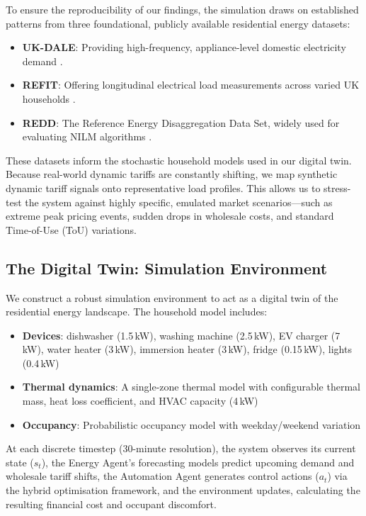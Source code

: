 \documentclass[11pt,a4paper]{article}
\begin{document}
To ensure the reproducibility of our findings, the simulation draws on established patterns from three foundational, publicly available residential energy datasets:
\begin{itemize}
    \item \textbf{UK-DALE}: Providing high-frequency, appliance-level domestic electricity demand \cite{kelly2015ukdale}.
    \item \textbf{REFIT}: Offering longitudinal electrical load measurements across varied UK households \cite{murray2017electrical}.
    \item \textbf{REDD}: The Reference Energy Disaggregation Data Set, widely used for evaluating NILM algorithms \cite{kolter2011redd}.
\end{itemize}

These datasets inform the stochastic household models used in our digital twin. Because real-world dynamic tariffs are constantly shifting, we map synthetic dynamic tariff signals onto representative load profiles. This allows us to stress-test the system against highly specific, emulated market scenarios---such as extreme peak pricing events, sudden drops in wholesale costs, and standard Time-of-Use (ToU) variations.

\subsection{The Digital Twin: Simulation Environment}

We construct a robust simulation environment to act as a digital twin of the residential energy landscape. The household model includes:
\begin{itemize}
    \item \textbf{Devices}: dishwasher (1.5\,kW), washing machine (2.5\,kW), EV charger (7\,kW), water heater (3\,kW), immersion heater (3\,kW), fridge (0.15\,kW), lights (0.4\,kW)
    \item \textbf{Thermal dynamics}: A single-zone thermal model with configurable thermal mass, heat loss coefficient, and HVAC capacity (4\,kW)
    \item \textbf{Occupancy}: Probabilistic occupancy model with weekday/weekend variation
\end{itemize}

At each discrete timestep (30-minute resolution), the system observes its current state ($s_t$), the Energy Agent's forecasting models predict upcoming demand and wholesale tariff shifts, the Automation Agent generates control actions ($a_t$) via the hybrid optimisation framework, and the environment updates, calculating the resulting financial cost and occupant discomfort.
\end{document}
